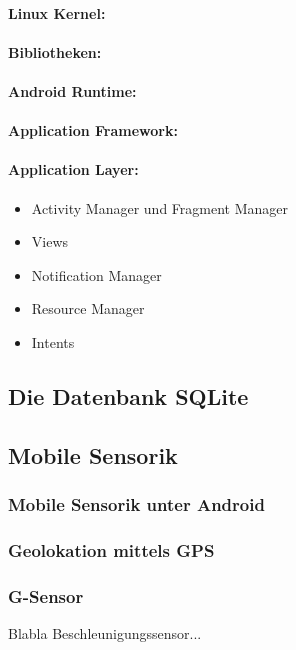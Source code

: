 \paragraph{Linux Kernel: }
\paragraph{Bibliotheken: }
\paragraph{Android Runtime: }
\paragraph{Application Framework: }
\paragraph{Application Layer: }
\begin{itemize}
	\item Activity Manager und Fragment Manager
	\item Views
	\item Notification Manager
	\item Resource Manager
	\item Intents
\end{itemize}

\subsection{Die Datenbank SQLite}
\subsection{Mobile Sensorik} 
\subsubsection{Mobile Sensorik unter Android}
\subsubsection{Geolokation mittels \gls{GPS}}
\subsubsection{G-Sensor}
Blabla Beschleunigungssensor...
\clearpage
